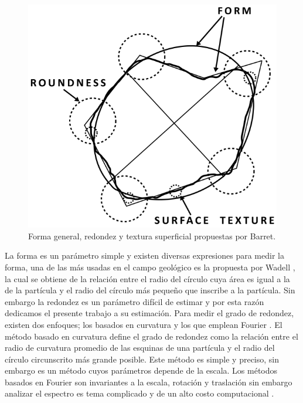 \documentclass[conference]{IEEEtran}
\begin{document}
\begin{figure}[htbp]
\centerline{\includegraphics[scale=0.4]{fig1.png}}
\caption{Forma general, redondez y textura superficial propuestas por Barret.}
\label{fig1}
\end{figure}

La forma es un parámetro simple y existen diversas expresiones para medir la forma, una de las más usadas en el campo geológico es la propuesta por Wadell \cite{b7}, la cual se obtiene de la relación entre el radio del círculo cuya área es igual a la de la partícula y el radio del círculo más pequeño que inscribe a la partícula. Sin embargo la redondez es un parámetro difícil de estimar y por esta razón dedicamos el presente trabajo a su estimación. Para medir el grado de redondez, existen dos enfoques; los basados en curvatura \cite{b8} y los que emplean Fourier \cite{b9}. El método basado en curvatura define el grado de redondez como la relación entre el radio de curvatura promedio de las esquinas de una partícula y el radio del círculo circunscrito más grande posible.  Este método es simple y preciso, sin embargo es un método cuyos parámetros depende de la escala. Los métodos basados en Fourier son invariantes a la escala, rotación y traslación sin embargo analizar el espectro es tema complicado y de un alto costo computacional \cite{b9}.
\end{document}
